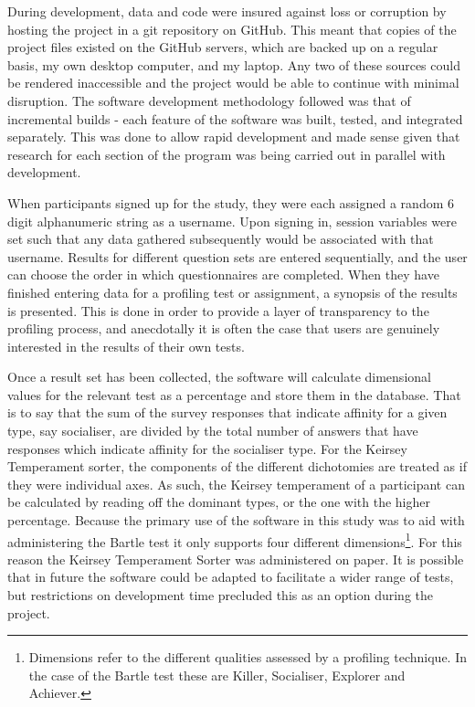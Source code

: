\documentclass[12pt,a4paper,twoside]{report}
\begin{document}
During development, data and code were insured against loss or corruption by hosting the project in a git repository on GitHub. This meant that copies of the project files existed on the GitHub servers, which are backed up on a regular basis, my own desktop computer, and my laptop. Any two of these sources could be rendered inaccessible and the project would be able to continue with minimal disruption. The software development methodology followed was that of incremental builds - each feature of the software was built, tested, and integrated separately. This was done to allow rapid development and made sense given that research for each section of the program was being carried out in parallel with development.

When participants signed up for the study, they were each assigned a random 6 digit alphanumeric string as a username. Upon signing in, session variables were set such that any data gathered subsequently would be associated with that username. Results for different question sets are entered sequentially, and the user can choose the order in which questionnaires are completed. When they have finished entering data for a profiling test or assignment, a synopsis of the results is presented. This is done in order to provide a layer of transparency to the profiling process, and anecdotally it is often the case that users are genuinely interested in the results of their own tests.

Once a result set has been collected, the software will calculate dimensional values for the relevant test as a percentage and store them in the database. That is to say that the sum of the survey responses that indicate affinity for a given type, say socialiser, are divided by the total number of answers that have responses which indicate affinity for the socialiser type. For the Keirsey Temperament sorter, the components of the different dichotomies are treated as if they were individual axes. As such, the Keirsey temperament of a participant can be calculated by reading off the dominant types, or the one with the higher percentage. Because the primary use of the software in this study was to aid with administering the Bartle test it only supports four different dimensions\footnote{Dimensions refer to the different qualities assessed by a profiling technique. In the case of the Bartle test these are Killer, Socialiser, Explorer and Achiever.}. For this reason the Keirsey Temperament Sorter was administered on paper. It is possible that in future the software could be adapted to facilitate a wider range of tests, but restrictions on development time precluded this as an option during the project.
\end{document}
